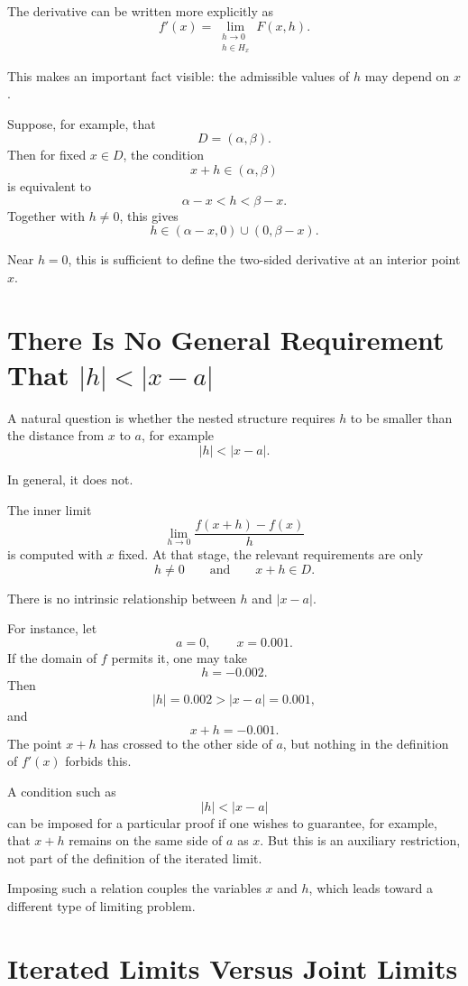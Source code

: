 \documentclass{essay}
\begin{document}
The derivative can be written more explicitly as
\[
f'(x)
=
\lim_{\substack{h\to 0\\ h\in H_x}}
F(x,h).
\]

This makes an important fact visible: the admissible values of \(h\) may depend on \(x\).

Suppose, for example, that
\[
D=(\alpha,\beta).
\]
Then for fixed \(x\in D\), the condition
\[
x+h\in(\alpha,\beta)
\]
is equivalent to
\[
\alpha-x<h<\beta-x.
\]
Together with \(h\neq 0\), this gives
\[
h\in(\alpha-x,0)\cup(0,\beta-x).
\]

Near \(h=0\), this is sufficient to define the two-sided derivative at an interior point \(x\).

\section{There Is No General Requirement That \texorpdfstring{\( |h|<|x-a| \)}{|h|<|x-a|}}

A natural question is whether the nested structure requires \(h\) to be smaller than the distance from \(x\) to \(a\), for example
\[
|h|<|x-a|.
\]

In general, it does not.

The inner limit
\[
\lim_{h\to 0}
\frac{f(x+h)-f(x)}{h}
\]
is computed with \(x\) fixed. At that stage, the relevant requirements are only
\[
h\neq 0
\qquad\text{and}\qquad
x+h\in D.
\]

There is no intrinsic relationship between \(h\) and \(|x-a|\).

For instance, let
\[
a=0,
\qquad
x=0.001.
\]
If the domain of \(f\) permits it, one may take
\[
h=-0.002.
\]
Then
\[
|h|=0.002>|x-a|=0.001,
\]
and
\[
x+h=-0.001.
\]
The point \(x+h\) has crossed to the other side of \(a\), but nothing in the definition of \(f'(x)\) forbids this.

A condition such as
\[
|h|<|x-a|
\]
can be imposed for a particular proof if one wishes to guarantee, for example, that \(x+h\) remains on the same side of \(a\) as \(x\). But this is an auxiliary restriction, not part of the definition of the iterated limit.

Imposing such a relation couples the variables \(x\) and \(h\), which leads toward a different type of limiting problem.

\section{Iterated Limits Versus Joint Limits}
\end{document}
